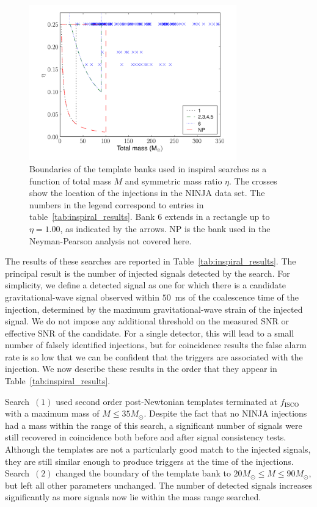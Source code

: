 \begin{figure}
  \begin{center}
  \includegraphics[width=0.8\textwidth]{figures/ninja1/ninja_banks}
  \end{center}
  \caption[Boundaries of template banks in NINJA-1 inspiral searches]{
\label{f:ninjaBanks}
Boundaries of the template banks used in inspiral searches as a
function of total mass $M$ and symmetric mass ratio $\eta$. The crosses show
the location of the injections in the NINJA data set. The numbers in the
legend correspond to entries in table~\ref{tab:inspiral_results}. Bank 6
extends in a rectangle up to $\eta = 1.00$, as indicated by the arrows. NP
is the bank used in the Neyman-Pearson analysis not covered here.}
\end{figure}

The results of these searches are reported in
Table~\ref{tab:inspiral_results}.  The principal result is the number
of injected signals detected by the search.  For simplicity, we define
a detected signal as one for which there is a candidate
gravitational-wave signal observed within $50$~ms of the coalescence
time of the injection, determined by the maximum gravitational-wave
strain of the injected signal.  We do not impose any additional
threshold on the measured SNR or effective SNR of the candidate.  For
a single detector, this will lead to a small number of falsely
identified injections, but for coincidence results the false alarm
rate is so low that we can be confident that the triggers are
associated with the injection. We now describe these results in the
order that they appear in Table~\ref{tab:inspiral_results}.

Search~$(1)$ used second order post-Newtonian templates terminated at
$f_\mathrm{ISCO}$ with a maximum mass of $M \le 35 M_{\odot}$.
Despite the fact that no NINJA injections had a mass within the range
of this search, a significant number of signals were still recovered
in coincidence both before and after signal consistency tests.
Although the templates are not a particularly good match to the
injected signals, they are still similar enough to produce triggers at
the time of the injections.  Search~$(2)$ changed the boundary of the
template bank to $20 M_\odot \le M \le 90 M_{\odot}$, but left all
other parameters unchanged.  The number of detected signals increases
significantly as more signals now lie within the mass range searched. 

